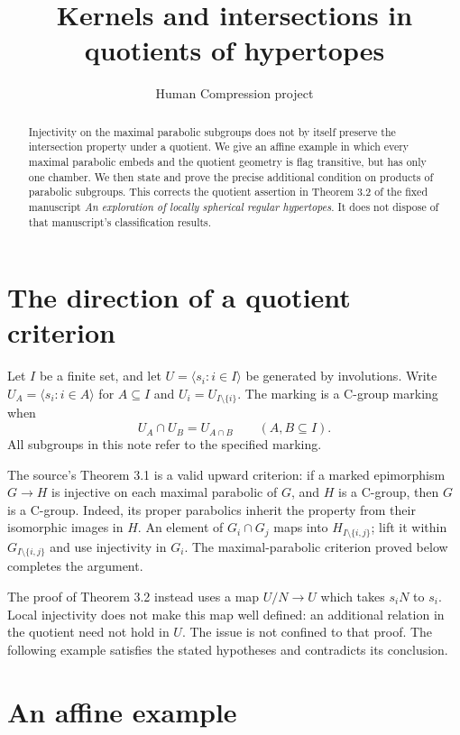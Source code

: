 \documentclass[11pt,a4paper]{article}
\title{Kernels and intersections in quotients of hypertopes}
\author{Human Compression project}
\date{}
\newcommand{\gen}[1]{\langle #1\rangle}
\begin{document}
\maketitle
\begin{abstract}
Injectivity on the maximal parabolic subgroups does not by itself preserve
the intersection property under a quotient. We give an affine example in
which every maximal parabolic embeds and the quotient geometry is flag
transitive, but has only one chamber. We then state and prove the precise
additional condition on products of parabolic subgroups. This corrects
the quotient assertion in Theorem 3.2 of the fixed manuscript
\emph{An exploration of locally spherical regular hypertopes}.
It does not dispose of that manuscript's classification results.
\end{abstract}

\section{The direction of a quotient criterion}

Let $I$ be a finite set, and let $U=\gen{s_i:i\in I}$ be generated by
involutions. Write $U_A=\gen{s_i:i\in A}$ for $A\subseteq I$ and
$U_i=U_{I\setminus\{i\}}$. The marking is a C-group marking when
\[
 U_A\cap U_B=U_{A\cap B}\qquad(A,B\subseteq I).
\]
All subgroups in this note refer to the specified marking.

The source's Theorem 3.1 is a valid upward criterion: if a marked
epimorphism $G\longrightarrow H$ is injective on each maximal parabolic
of $G$, and $H$ is a C-group, then $G$ is a C-group. Indeed, its proper
parabolics inherit the property from their isomorphic images in $H$.
An element of $G_i\cap G_j$ maps into $H_{I\setminus\{i,j\}}$;
lift it within $G_{I\setminus\{i,j\}}$ and use injectivity in $G_i$.
The maximal-parabolic criterion proved below completes the argument.

The proof of Theorem 3.2 instead uses a map $U/N\longrightarrow U$
which takes $s_iN$ to $s_i$. Local injectivity does not make this map
well defined: an additional relation in the quotient need not hold in
$U$. The issue is not confined to that proof. The following example
satisfies the stated hypotheses and contradicts its conclusion.

\section{An affine example}
\end{document}
